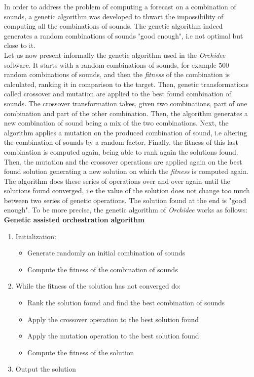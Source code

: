 \documentclass[a4paper]{book}
\begin{document}
In order to address the problem of computing a forecast on a combination of sounds, a genetic algorithm was developed to thwart the impossibility of computing all the combinations of sounds. The genetic algorithm indeed generates a random combinations of sounds "good enough", i.e not optimal but close to it. \\
Let us now present informally the genetic algorithm used in the \textit{Orchidee} software. It starts with a random combinations of sounds, for example $500$ random combinations of sounds, and then the \textit{fitness} of the combination is calculated, ranking it in comparison to the target. Then, genetic transformations called crossover and mutation are applied to the best found combination of sounds. The crossover transformation takes, given two combinations, part of one combination and part of the other combination. Then, the algorithm generates a new combination of sound being a mix of the two combinations. Next, the algorithm applies a mutation on the produced combination of sound, i.e altering the combination of sounds by a random factor. Finally, the fitness of this last combination is computed again, being able to rank again the solutions found. Then, the mutation and the crossover operations are applied again on the best found solution generating a new solution on which the \textit{fitness} is computed again. The algorithm does these series of operations over and over again until the solutions found converged, i.e the value of the solution does not change too much between two series of genetic operations. The solution found at the end is "good enough". To be more precise, the genetic algorithm of \textit{Orchidee} works as follows:\\

\textbf{Genetic assisted orchestration algorithm}
\begin{enumerate}
    \item Initialization:
    \begin{itemize}
        \item Generate randomly an initial combination of sounds 
        \item Compute the fitness of the combination of sounds 
    \end{itemize}
    \item While the fitness of the solution has not converged do:
    \begin{itemize}
        \item Rank the solution found and find the best combination of sounds
        \item Apply the crossover operation to the best solution found
        \item Apply the mutation operation to the best solution found
        \item Compute the fitness of the solution
    \end{itemize}
    \item Output the solution
\end{enumerate}
\end{document}
